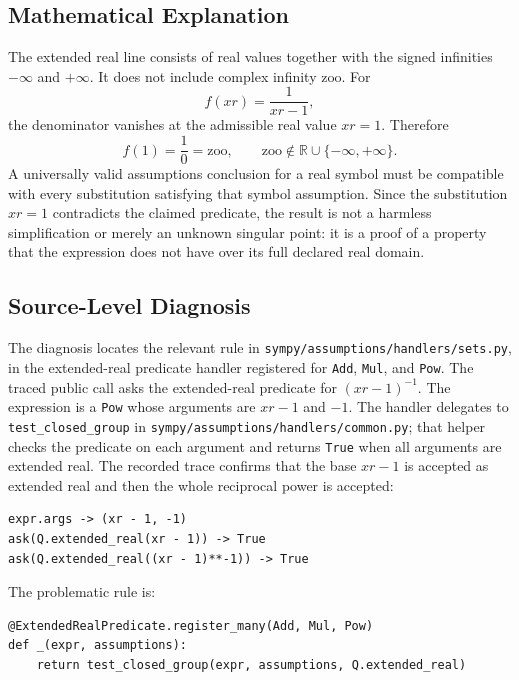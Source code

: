 \documentclass[11pt]{article}
\begin{document}
\subsection{Mathematical Explanation}

The extended real line consists of real values together with the signed
infinities \(-\infty\) and \(+\infty\).  It does not include complex infinity
\(\mathrm{zoo}\).  For
\[
  f(xr)=\frac{1}{xr-1},
\]
the denominator vanishes at the admissible real value \(xr=1\).  Therefore
\[
  f(1)=\frac{1}{0}=\mathrm{zoo},
  \qquad
  \mathrm{zoo}\notin \mathbb{R}\cup\{-\infty,+\infty\}.
\]
A universally valid assumptions conclusion for a real symbol must be compatible
with every substitution satisfying that symbol assumption.  Since the substitution
\(xr=1\) contradicts the claimed predicate, the result is not a harmless
simplification or merely an unknown singular point: it is a proof of a property
that the expression does not have over its full declared real domain.

\subsection{Source-Level Diagnosis}

The diagnosis locates the relevant rule in
\nolinkurl{sympy/assumptions/handlers/sets.py}, in the
extended-real predicate handler registered for \texttt{Add},
\texttt{Mul}, and \texttt{Pow}.  The traced public call asks the extended-real
predicate for \((xr-1)^{-1}\).  The expression is a
\texttt{Pow} whose arguments are \(xr-1\) and \(-1\).  The handler delegates to
\texttt{test\_closed\_group} in
\nolinkurl{sympy/assumptions/handlers/common.py}; that helper checks the
predicate on each argument and returns \texttt{True} when all arguments are
extended real.  The recorded trace confirms that the base \(xr-1\) is accepted
as extended real and then the whole reciprocal power is accepted:

\begin{lstlisting}[style=bugpython]
expr.args -> (xr - 1, -1)
ask(Q.extended_real(xr - 1)) -> True
ask(Q.extended_real((xr - 1)**-1)) -> True
\end{lstlisting}

The problematic rule is:

\begin{lstlisting}[style=bugpython]
@ExtendedRealPredicate.register_many(Add, Mul, Pow)
def _(expr, assumptions):
    return test_closed_group(expr, assumptions, Q.extended_real)
\end{lstlisting}
\end{document}
